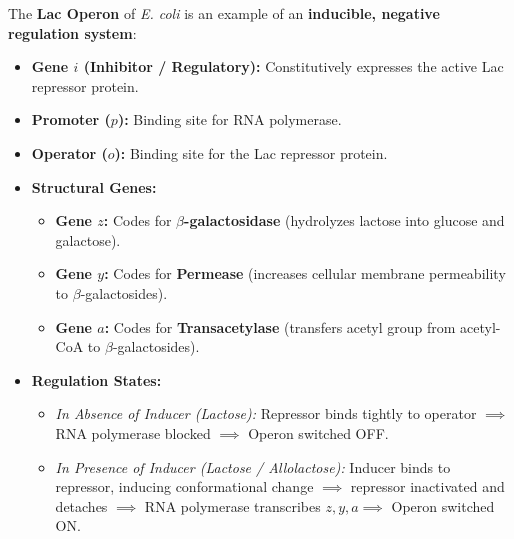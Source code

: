 \documentclass[10pt,a4paper]{article}
\begin{document}
\begin{conceptbox}
The \textbf{Lac Operon} of \textit{E. coli} is an example of an \textbf{inducible, negative regulation system}:
\begin{itemize}
  \item \textbf{Gene $i$ (Inhibitor / Regulatory):} Constitutively expresses the active Lac repressor protein.
  \item \textbf{Promoter ($p$):} Binding site for RNA polymerase.
  \item \textbf{Operator ($o$):} Binding site for the Lac repressor protein.
  \item \textbf{Structural Genes:}
  \begin{itemize}
    \item \textbf{Gene $z$:} Codes for \textbf{$\beta$-galactosidase} (hydrolyzes lactose into glucose and galactose).
    \item \textbf{Gene $y$:} Codes for \textbf{Permease} (increases cellular membrane permeability to $\beta$-galactosides).
    \item \textbf{Gene $a$:} Codes for \textbf{Transacetylase} (transfers acetyl group from acetyl-CoA to $\beta$-galactosides).
  \end{itemize}
  \item \textbf{Regulation States:}
  \begin{itemize}
    \item \textit{In Absence of Inducer (Lactose):} Repressor binds tightly to operator $\implies$ RNA polymerase blocked $\implies$ Operon switched OFF.
    \item \textit{In Presence of Inducer (Lactose / Allolactose):} Inducer binds to repressor, inducing conformational change $\implies$ repressor inactivated and detaches $\implies$ RNA polymerase transcribes $z, y, a \implies$ Operon switched ON.
  \end{itemize}
\end{itemize}
\end{conceptbox}
\end{document}
